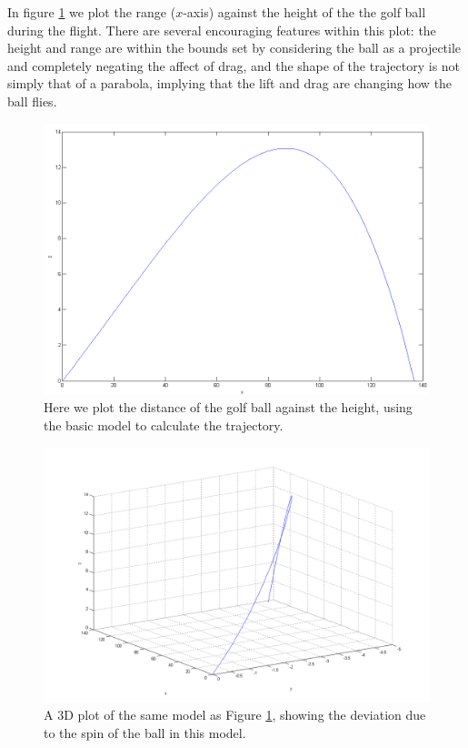 In figure \ref{2d-test-rr} we plot the range ($x$-axis) against the height of the the golf ball during
the flight. There are several encouraging features within this plot: the height and range are within
the bounds set by considering the ball as a projectile and completely negating the affect of drag, and
the shape of the trajectory is not simply that of a parabola, implying that the lift and drag are changing how
the ball flies.
\begin{figure}
\centering
\includegraphics[scale=0.6]{../images/rr_traj_basic.png}
\caption[2D plot of an example Robinson and Robinson model trajectory]{Here we plot the distance of the
golf ball against the height, using the basic \citeauthor*{Robinson2013} model to calculate the trajectory.}
\label{2d-test-rr}
\end{figure}

\begin{figure}
\centering
\includegraphics[scale=0.4]{../images/3d-rr.png}
\caption[3D plot of an example Robinson and Robinson model trajectory]{A 3D plot of the same model as
Figure \ref{2d-test-rr}, showing the deviation due to the spin of the ball in this model.}
\label{3d-test-rr}
\end{figure}


